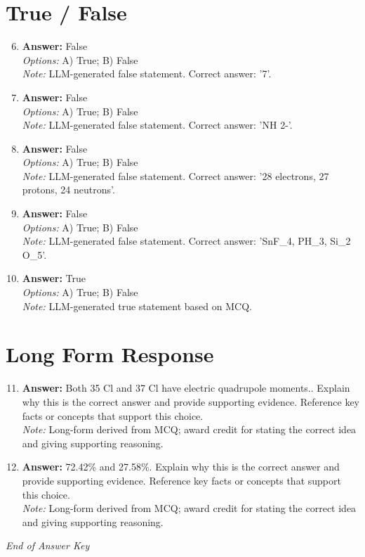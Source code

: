 \documentclass[12pt]{article}
\begin{document}
\section*{True / False}
\begin{enumerate}[label=\arabic*.]
\setcounter{enumi}{5}
\item \textbf{Answer:} False
\\ \textit{Options:} A) True; B) False
\\ \textit{Note:} LLM-generated false statement. Correct answer: '7'.
\item \textbf{Answer:} False
\\ \textit{Options:} A) True; B) False
\\ \textit{Note:} LLM-generated false statement. Correct answer: 'NH 2-'.
\item \textbf{Answer:} False
\\ \textit{Options:} A) True; B) False
\\ \textit{Note:} LLM-generated false statement. Correct answer: '28 electrons, 27 protons, 24 neutrons'.
\item \textbf{Answer:} False
\\ \textit{Options:} A) True; B) False
\\ \textit{Note:} LLM-generated false statement. Correct answer: 'SnF\_4, PH\_3, Si\_2 O\_5'.
\item \textbf{Answer:} True
\\ \textit{Options:} A) True; B) False
\\ \textit{Note:} LLM-generated true statement based on MCQ.
\end{enumerate}

\section*{Long Form Response}
\begin{enumerate}[label=\arabic*.]
\setcounter{enumi}{10}
\item \textbf{Answer:} Both 35 Cl and 37 Cl have electric quadrupole moments.. Explain why this is the correct answer and provide supporting evidence. Reference key facts or concepts that support this choice.
\\ \textit{Note:} Long-form derived from MCQ; award credit for stating the correct idea and giving supporting reasoning.
\item \textbf{Answer:} 72.42\% and 27.58\%. Explain why this is the correct answer and provide supporting evidence. Reference key facts or concepts that support this choice.
\\ \textit{Note:} Long-form derived from MCQ; award credit for stating the correct idea and giving supporting reasoning.
\end{enumerate}

\vfill
\noindent\textit{End of Answer Key}
\end{document}
